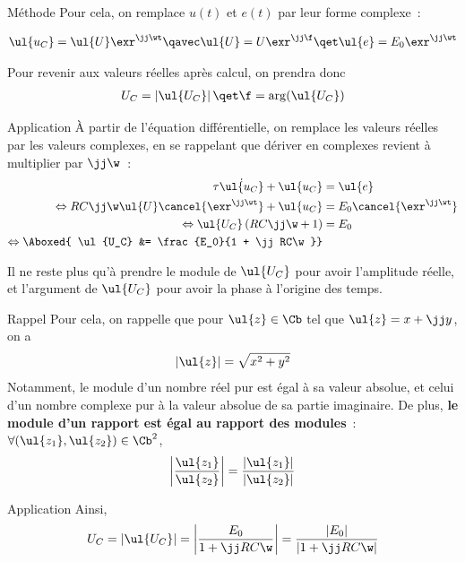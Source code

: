 \documentclass[../main/main.tex]{subfiles}
\begin{document}
\begin{rdemo}{Méthode}
    Pour cela, on remplace $u(t)$ et $e(t)$ par leur forme complexe~:

    \begin{gather*}
        \ul{u_C} = \ul{U}\exr^{\jj\wt}
        \qavec
        \ul{U} = U\exr^{\jj\f}
        \qet
        \ul{e} = E_0\exr^{\jj\wt}
    \end{gather*}

    Pour revenir aux valeurs réelles après calcul, on prendra donc
    \begin{gather*}
        U_C = \left| \ul{U_C} \right|
        \qet
        \f = \arg(\ul{U_C})
    \end{gather*}
\end{rdemo}

\begin{rexem}{Application}
    À partir de l'équation différentielle, on remplace les valeurs réelles par les
    valeurs complexes, en se rappelant que dériver en complexes revient à multiplier
    par $\jj\w$~:
    \begin{align*}
        \tau\dot{\ul{u_C}} + \ul{u_C} &= \ul{e}\\
        \Leftrightarrow
        RC\jj\w\ul{U}\cancel{\exr^{\jj\wt}} + \ul{u_C} &=
        E_0\cancel{\exr^{\jj\wt}}\\
        \Leftrightarrow
        \ul{U_C} \left( RC\jj\w + 1 \right) &= E_0\\
        \Leftrightarrow
        \Aboxed{
        \ul{U_C} &= \frac{E_0}{1 + \jj RC\w}}
    \end{align*}
\end{rexem}
    Il ne reste plus qu'à prendre le module de $\ul{U_C}$ pour avoir l'amplitude
    réelle, et l'argument de $\ul{U_C}$ pour avoir la phase à l'origine des
    temps.
\begin{rrapp}{Rappel}
    Pour cela, on rappelle que pour $\ul{z} \in \Cb$ tel que $\ul{z} = x + \jj
    y$, on a
    \[ \left| \ul{z} \right| = \sqrt{x^2 + y^2}\]
    Notamment, le module d'un nombre réel pur est égal à sa valeur absolue,
    et celui d'un nombre complexe pur à la valeur absolue de sa partie
    imaginaire. \bigbreak
    De plus, \textbf{le module d'un rapport est égal au rapport des modules}~:
    $\forall (\ul{z_1}, \ul{z_2}) \in \Cb^2$,
    \[ \left| \frac{\ul{z_1}}{\ul{z_2}} \right| =
    \frac{|\ul{z_1}|}{|\ul{z_2}|}\]
    \vspace*{-30pt}
\end{rrapp}
\begin{rexem}{Application}
    Ainsi,
    \begin{gather*}
        U_C
            = \left| \ul{U_C} \right|
            = \left| \frac{E_0}{1 + \jj RC\w} \right|
            = \frac{|E_0|}{|1 + \jj RC\w|}\\
    \end{gather*}
    \vspace*{-70pt}
\end{rexem}
\end{document}

